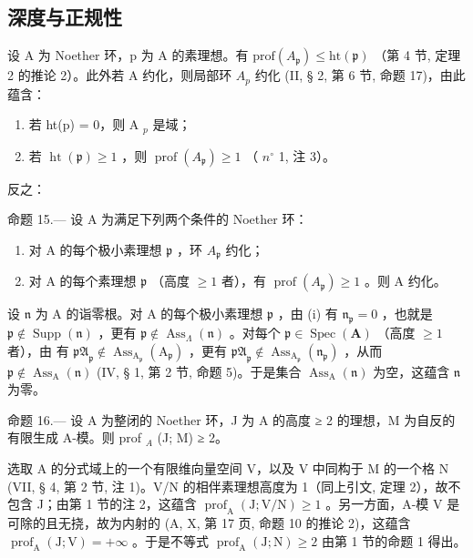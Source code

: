 \subsection{深度与正规性}

设 A 为 Noether 环，p 为 A 的素理想。有 \(\text{prof}(A_{\mathfrak{p}}) \leqslant \text{ht}(\mathfrak{p})\) （第 4 节, 定理 2 的推论 2）。此外若 A 约化，则局部环 \(A_{p}\) 约化 (II, § 2, 第 6 节, 命题 17)，由此蕴含：

\begin{enumerate}
\def\labelenumi{\alph{enumi})}
\item
  若 ht(p) = 0，则 A \(_{p}\) 是域；
\item
  若 \(\operatorname{ht}(\mathfrak{p}) \geqslant 1\) ，则 \(\operatorname{prof}(A_{\mathfrak{p}}) \geqslant 1\) （ \(n^{\circ}\) 1, 注 3）。
\end{enumerate}

反之：

命题 15.--- 设 A 为满足下列两个条件的 Noether 环：

\begin{enumerate}
\def\labelenumi{(\roman{enumi})}
\item
  对 A 的每个极小素理想 \(\mathfrak{p}\) ，环 \(A_{\mathfrak{p}}\) 约化；
\item
  对 A 的每个素理想 \(\mathfrak{p}\) （高度 \(\geqslant 1\) 者），有 \(\operatorname{prof}(A_{\mathfrak{p}}) \geqslant 1\) 。则 A 约化。
\end{enumerate}

设 \(\mathfrak{n}\) 为 A 的诣零根。对 A 的每个极小素理想 \(\mathfrak{p}\) ，由 (i) 有 \(\mathfrak{n}_{\mathfrak{p}} = 0\) ，也就是 \(\mathfrak{p} \notin \operatorname{Supp}(\mathfrak{n})\) ，更有 \(\mathfrak{p} \notin \operatorname{Ass}_{\Lambda}(\mathfrak{n})\) 。对每个 \(\mathfrak{p} \in \operatorname{Spec}(\mathbf{A})\) （高度 \(\geqslant 1\) 者），由 有 \(\mathfrak{pA}_{\mathfrak{p}} \notin \operatorname{Ass}_{\mathrm{A}_{\mathfrak{p}}}(\mathrm{A}_{\mathfrak{p}})\) ，更有 \(\mathfrak{pA}_{\mathfrak{p}} \notin \operatorname{Ass}_{\mathrm{A}_{\mathfrak{p}}}(\mathfrak{n}_{\mathfrak{p}})\) ，从而 \(\mathfrak{p} \notin \operatorname{Ass}_{\mathrm{A}}(\mathfrak{n})\) (IV, § 1, 第 2 节, 命题 5)。于是集合 \(\operatorname{Ass}_{\mathrm{A}}(\mathfrak{n})\) 为空，这蕴含 \(\mathfrak{n}\) 为零。

命题 16.--- 设 A 为整闭的 Noether 环，J 为 A 的高度 ≥ 2 的理想，M 为自反的有限生成 A-模。则 prof \(_{A}\) (J; M) ≥ 2。

选取 A 的分式域上的一个有限维向量空间 V，以及 V 中同构于 M 的一个格 N (VII, § 4, 第 2 节, 注 1)。V/N 的相伴素理想高度为 1（同上引文, 定理 2），故不包含 J；由第 1 节的注 2，这蕴含 \(\operatorname{prof}_{\mathrm{A}}(\mathrm{J};\mathrm{V}/\mathrm{N}) \geqslant 1\) 。另一方面，A-模 V 是可除的且无挠，故为内射的 (A, X, 第 17 页, 命题 10 的推论 2)，这蕴含 \(\operatorname{prof}_{\mathrm{A}}(\mathrm{J};\mathrm{V}) = +\infty\) 。于是不等式 \(\operatorname{prof}_{\mathrm{A}}(\mathrm{J};\mathrm{N}) \geqslant 2\) 由第 1 节的命题 1 得出。

